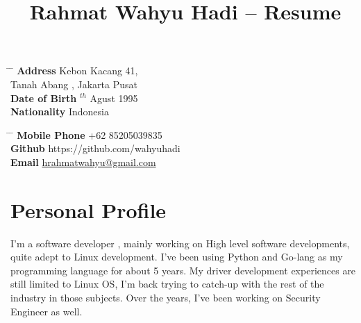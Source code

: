 \documentclass[10pt]{article} %
\begin{document}

\title{Rahmat Wahyu Hadi -- Resume} %


\parbox{0.5\textwidth}{ %
\begin{tabbing} %
\hspace{3cm} \= \hspace{4cm} \= \kill %
{\bf Address} \> Kebon Kacang 41,\\ %
\> Tanah Abang , Jakarta Pusat  \\ %
{\bf Date of Birth} $^{th}$ Agust 1995 \\ %
{\bf Nationality} \> Indonesia %
\end{tabbing}}
\hfill %
\parbox{0.5\textwidth}{ %
\begin{tabbing} %
\hspace{3cm} \= \hspace{4cm} \= \kill %
{\bf Mobile Phone} \> +62 85205039835 \\ %
{\bf Github} \> https://github.com/wahyuhadi\\ %
{\bf Email} \> \href{mailto:hrahmatwahyu@gmail.com}{hrahmatwahyu@gmail.com} \\ %
\end{tabbing}}


\section{Personal Profile}

I'm a software developer , mainly working on High level software developments, quite adept to Linux development. 
I've been using Python and Go-lang as my programming language for about 5 years. My driver development experiences are still limited to Linux OS,  I'm back trying to catch-up with the rest of the industry in those subjects. Over the years, I've been working on  Security Engineer as well.
\end{document}
